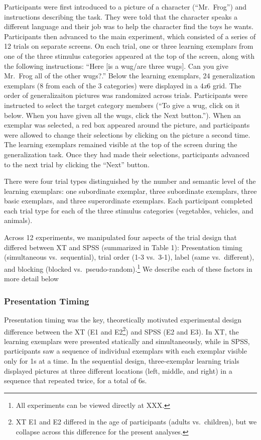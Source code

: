 \documentclass[english,floatsintext,man]{apa6}
\theoremstyle{definition}
\theoremstyle{definition}
\theoremstyle{remark}
\begin{document}
Participants were first introduced to a picture of a character
(\enquote{Mr.~Frog}) and instructions describing the task. They were
told that the character speaks a different language and their job was to
help the character find the toys he wants. Participants then advanced to
the main experiment, which consisted of a series of 12 trials on
separate screens. On each trial, one or three learning exemplars from
one of the three stimulus categories appeared at the top of the screen,
along with the following instructions: \enquote{Here {[}is a wug/are
three wugs{]}. Can you give Mr.~Frog all of the other wugs?.} Below the
learning exemplars, 24 generalization exemplars (8 from each of the 3
categories) were displayed in a 4\emph{x}6 grid. The order of
generalizaiton pictures was randomized across trials. Participants were
instructed to select the target category members (\enquote{To give a
wug, click on it below. When you have given all the wugs, click the Next
button.}). When an exemplar was selected, a red box appeared around the
picture, and participants were allowed to change their selections by
clicking on the picture a second time. The learning exemplars remained
visible at the top of the screen during the generalization task. Once
they had made their selections, participants advanced to the next trial
by clicking the \enquote{Next} button.

There were four trial types distinguished by the number and semantic
level of the learning exemplars: one subordinate exemplar, three
subordinate exemplars, three basic exemplars, and three superordinate
exemplars. Each participant completed each trial type for each of the
three stimulus categories (vegetables, vehicles, and animals).

Across 12 experiments, we manipulated four aspects of the trial design
that differed between XT and SPSS (summarized in Table 1): Presentation
timing (simultaneous vs.~sequential), trial order (1-3 vs.~3-1), label
(same vs.~different), and blocking (blocked
vs.~pseudo-random).\footnote{All experiments can be viewed directly at XXX.}
We describe each of these factors in more detail below

\subsubsection{Presentation Timing}\label{presentation-timing}

Presentation timing was the key, theoretically motivated experimental
design difference between the XT (E1 and
E2\footnote{XT E1 and E2 differed in the age of participants (adults vs.\ children), but we collapse across this difference for the present analyses.})
and SPSS (E2 and E3). In XT, the learning exemplars were presented
statically and simultaneously, while in SPSS, participants saw a
sequence of individual exemplars with each exemplar visible only for 1s
at a time. In the sequential design, three-exemplar learning trials
displayed pictures at three different locations (left, middle, and
right) in a sequence that repeated twice, for a total of 6s.
\end{document}
